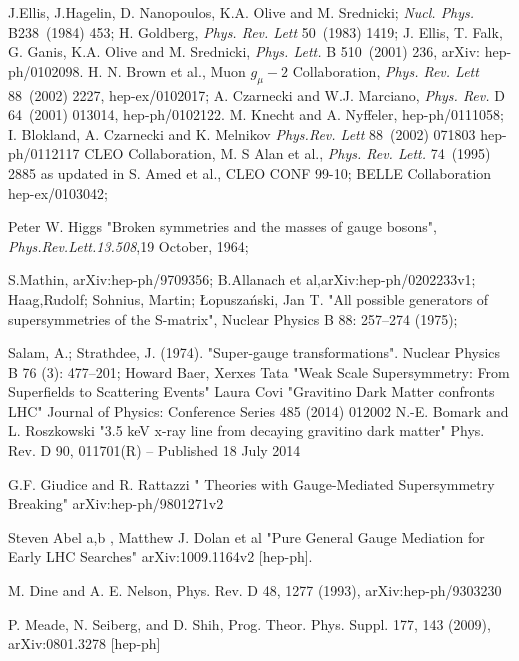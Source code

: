 \begin{thebibliography}{9}
 J.Ellis, J.Hagelin, D. Nanopoulos, K.A. Olive and M. Srednicki; \emph{Nucl. Phys.} B238~(1984) 453; H. Goldberg, \emph{Phys. Rev. Lett} 50~(1983) 1419;
J. Ellis, T. Falk, G. Ganis, K.A. Olive and M. Srednicki, \emph{Phys. Lett.} B 510~(2001) 236, arXiv: hep-ph/0102098.
H. N. Brown et al., Muon $g_{\mu}-2$ Collaboration, \emph{Phys. Rev. Lett} 88~(2002) 2227, hep-ex/0102017; A. Czarnecki and W.J. Marciano,
\emph{ Phys. Rev.} D 64~(2001) 013014, hep-ph/0102122.
 M. Knecht and A. Nyffeler, hep-ph/0111058; I. Blokland, A. Czarnecki and K. Melnikov \emph{Phys.Rev. Lett} 88~(2002) 071803 hep-ph/0112117
CLEO Collaboration, M. S Alan et al., \emph{Phys. Rev. Lett.} 74~(1995) 2885 as updated in S. Amed et al., CLEO CONF 99-10; 
 BELLE Collaboration hep-ex/0103042;

 Peter W. Higgs "Broken symmetries and the masses of gauge bosons", \emph{Phys.Rev.Lett.13.508},19 October, 1964;

 S.Mathin, arXiv:hep-ph/9709356;
 B.Allanach et al,arXiv:hep-ph/0202233v1;
 Haag,Rudolf; Sohnius, Martin; Łopuszański, Jan T. "All possible generators of supersymmetries of the S-matrix", Nuclear Physics B 88: 257–274 (1975);

 Salam, A.; Strathdee, J. (1974). "Super-gauge transformations". Nuclear Physics B 76 (3): 477–201;
 Howard Baer, Xerxes Tata "Weak Scale Supersymmetry: From Superfields to Scattering Events"
Laura Covi "Gravitino Dark Matter confronts LHC" Journal of Physics: Conference Series 485 (2014) 012002
 N.-E. Bomark and L. Roszkowski "3.5 keV x-ray line from decaying gravitino dark matter" Phys. Rev. D 90, 011701(R) – Published 18 July 2014

G.F. Giudice and R. Rattazzi " Theories with Gauge-Mediated Supersymmetry Breaking" arXiv:hep-ph/9801271v2

 Steven Abel a,b , Matthew J. Dolan et al "Pure General Gauge Mediation for Early LHC Searches"  arXiv:1009.1164v2 [hep-ph].

M. Dine and A. E. Nelson, Phys. Rev. D 48, 1277
(1993), arXiv:hep-ph/9303230

P. Meade, N. Seiberg, and D. Shih, Prog. Theor. Phys.
Suppl. 177, 143 (2009), arXiv:0801.3278 [hep-ph]


\end{thebibliography}
